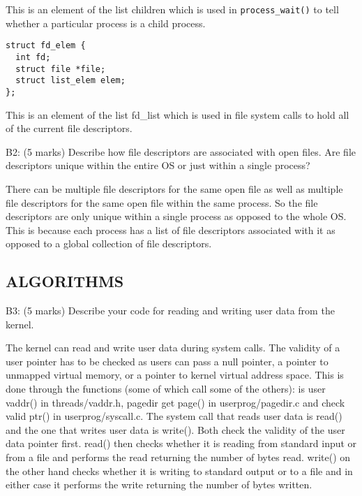 This is an element of the list children which is used in \texttt{process\_wait()} to tell whether a particular process is a child process.

\begin{verbatim}
struct fd_elem {
  int fd;
  struct file *file;
  struct list_elem elem;
};
\end{verbatim}

This is an element of the list fd\_list which is used in file system calls to hold all of the current file descriptors.




\noindent B2: (5 marks)
Describe how file descriptors are associated with open files.
Are file descriptors unique within the entire OS or just within a
single process?


There can be multiple file descriptors for the same open file as well as multiple file descriptors for the same open file within the same process. So the file descriptors are only unique within a single process as opposed to the whole OS. This is because each process has a list of file descriptors associated with it as opposed to a global collection of file descriptors.


\subsection*{ALGORITHMS}

\noindent B3: (5 marks)
Describe your code for reading and writing user data from the
kernel.


The kernel can read and write user data during system calls. The validity of a user pointer has to be checked as users can pass a null pointer, a pointer to unmapped virtual memory, or a pointer to kernel virtual address space. This is done through the functions (some of which call some of the others): is user vaddr() in threads/vaddr.h, pagedir get page() in userprog/pagedir.c and check valid ptr() in userprog/syscall.c. The system call that reads user data is read() and the one that writes user data is write(). Both check the validity of the user data pointer first. read() then checks whether it is reading from standard input or from a file and performs the read returning the number of bytes read. write() on the other hand checks whether it is writing to standard output or to a file and in either case it performs the write returning the number of bytes written.

